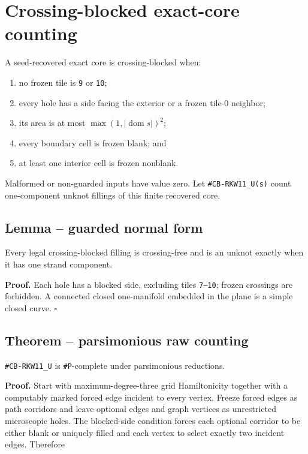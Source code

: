 \documentclass[11pt]{article}
\begin{document}
\section{Crossing-blocked exact-core counting}

A seed-recovered exact core is crossing-blocked when:

\begin{enumerate}
\item no frozen tile is \texttt{9} or \texttt{10};
\item every hole has a side facing the exterior or a frozen tile-0 neighbor;
\item its area is at most $\max(1,|\operatorname{dom}s|)^2$;
\item every boundary cell is frozen blank; and
\item at least one interior cell is frozen nonblank.
\end{enumerate}

Malformed or non-guarded inputs have value zero.  Let \texttt{\#CB-RKW11\_U(s)} count
one-component unknot fillings of this finite recovered core.

\subsection{Lemma -- guarded normal form}

Every legal crossing-blocked filling is crossing-free and is an unknot exactly
when it has one strand component.

\textbf{Proof.}  Each hole has a blocked side, excluding tiles \texttt{7--10}; frozen
crossings are forbidden.  A connected closed one-manifold embedded in the
plane is a simple closed curve. \hfill$\square$

\subsection{Theorem -- parsimonious raw counting}

\texttt{\#CB-RKW11\_U} is \texttt{\#P}-complete under parsimonious reductions.

\textbf{Proof.}  Start with maximum-degree-three grid Hamiltonicity together with a
computably marked forced edge incident to every vertex.  Freeze forced edges
as path corridors and leave optional edges and graph vertices as unrestricted
microscopic holes.  The blocked-side condition forces each optional corridor
to be either blank or uniquely filled and each vertex to select exactly two
incident edges.  Therefore
\end{document}
